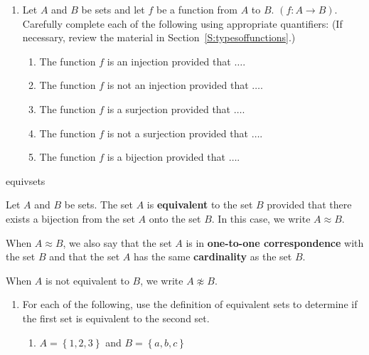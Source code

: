 \begin{previewactivity}\label{PA:equivalentsets} \hfill
\begin{enumerate}
\item Let $A$ and $B$ be sets and let $f$ be a function from $A$ to $B$.  $\left(f:A \to B \right)$.  Carefully complete each of the following using appropriate quantifiers:  (If necessary, review the material in Section~\ref{S:typesoffunctions}.)
\begin{enumerate}
\item The function $f$ is an injection provided that $\ldots .$
\item The function $f$ is not an injection provided that $\ldots .$
\item The function $f$ is a surjection provided that $\ldots .$
\item The function $f$ is not a surjection provided that $\ldots .$
\item The function $f$ is a bijection provided that $\ldots .$
\end{enumerate}
\end{enumerate}

\begin{defbox}{equivsets}{Let $A$ and $B$ be sets.  The set $A$ is \textbf{equivalent} to the set $B$ 
%
provided that there exists a bijection from the set $A$ onto the set $B$.  In this case, we write 
$A \approx B$.  
\label{sym:AequivB}%

\vskip6pt
When $A \approx B$, we also say that the set $A$ is in \textbf{one-to-one correspondence} 
%
with the set $B$ and that the set $A$ has the same \textbf{cardinality} 
%
as the set $B$.
}
\end{defbox}
\noindent
\note  When $A$ is not equivalent to $B$, we write $A \not \approx B$.

\setcounter{oldenumi}{\theenumi}
\begin{enumerate} \setcounter{enumi}{\theoldenumi}
\item For each of the following, use the definition of equivalent sets to determine if the first set is equivalent to the second set.

\begin{enumerate}
\item $A = \left\{ 1, 2, 3 \right\}$ and $B = \left\{ a, b, c \right\}$  


\end{enumerate}
\end{enumerate}
\end{previewactivity}
